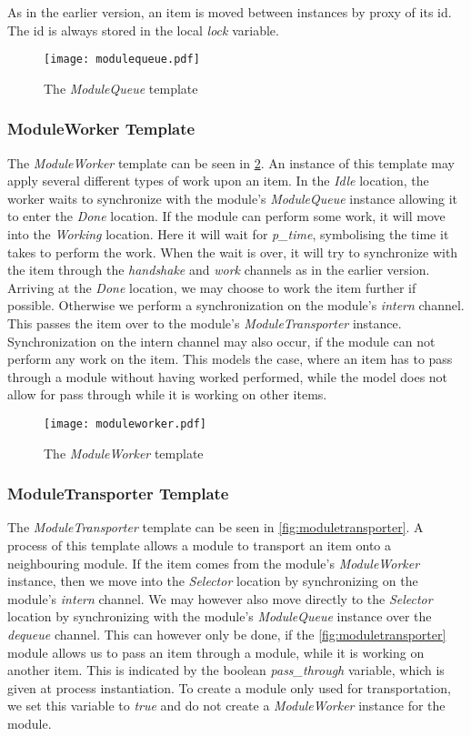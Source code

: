 As in the earlier version, an item is moved between instances by proxy of its id. The id is always stored in the local \emph{lock} variable.   

\begin{figure}[h]
\centering
\texttt{[image: modulequeue.pdf]}
\caption{The \textit{ModuleQueue} template}
\label{fig:modulequeue}
\end{figure}


\subsubsection{ModuleWorker Template}\label{subs:moduleworker}
The \emph{ModuleWorker} template can be seen in \cref{fig:moduleworker}. An instance of this template may apply several different types of work upon an item. In the \textit{Idle} location, the worker waits to synchronize with the module's \emph{ModuleQueue} instance allowing it to enter the \textit{Done} location. If the module can perform some work, it will move into the \emph{Working} location. Here it will wait for \emph{p\_time}, symbolising the time it takes to perform the work. When the wait is over, it will try to synchronize with the item through the \emph{handshake} and \emph{work} channels as in the earlier version. Arriving at the \emph{Done} location, we may choose to work the item further if possible. Otherwise we perform a synchronization on the module's \emph{intern} channel. This passes the item over to the module's \emph{ModuleTransporter} instance. Synchronization on the intern channel may also occur, if the module can not perform any work on the item. This models the case, where an item has to pass through a module without having worked performed, while the model does not allow for pass through while it is working on other items.

\begin{figure}[h]
\centering
\texttt{[image: moduleworker.pdf]}
\caption{The \textit{ModuleWorker} template}
\label{fig:moduleworker}
\end{figure}

\subsubsection{ModuleTransporter Template}
The \emph{ModuleTransporter} template can be seen in \cref{fig:moduletransporter}. A process of this template allows a module to transport an item onto a neighbouring module. If the item comes from the module's \emph{ModuleWorker} instance, then we move into the \emph{Selector} location by synchronizing on the module's \emph{intern} channel. We may however also move directly to the \emph{Selector} location by synchronizing with the module's \emph{ModuleQueue} instance over the \emph{dequeue} channel. This can however only be done, if the \cref{fig:moduletransporter} module allows us to pass an item through a module, while it is working on another item. This is indicated by the boolean \emph{pass\_through} variable, which is given at process instantiation. To create a module only used for transportation, we set this variable to \emph{true} and do not create a \emph{ModuleWorker} instance for the module. 

